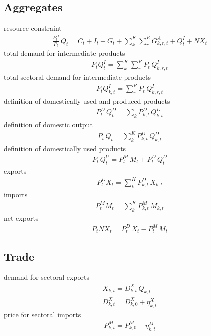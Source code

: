 \subsection{Aggregates}
resource constraint
\begin{align}
\frac{P^{D}_t}{P_t} \, Q_{t} = C_{t} + I_{t} + G_{t} + \sum_{k}^{K} \sum_{r}^{R} {G^{A}_{k,r,t}} + Q^{I}_{t} + {NX_{t}} \label{eq:resourceconstraint}
\end{align}
total demand for intermediate products
\begin{align}
P_{t} Q^{I}_{t} = \sum_{k}^{K} \sum_{r}^{R} P_{t} \, Q^{I}_{k,r,t}
\end{align}
total sectoral demand for intermediate products
\begin{align}
P_{t} Q^{I}_{k,t} = \sum_{r}^{R} P_{t} \, Q^{I}_{k,r,t}
\end{align}
definition of domestically used and produced products
\begin{align}
P^{D}_{t} \, Q^{D}_{t} = \sum_{k} P^{D}_{k,t} \, Q^{D}_{k,t}
\end{align}
definition of domestic output
\begin{align}
P_{t} \, Q_{t} = \sum_{k}^{K} P^{D}_{k,t} \, Q^{D}_{k,t}
\end{align}
definition of domestically used products
\begin{align}
P_{t} \, Q^{U}_{t} = P^{M}_{t} \, M_{t} + P^{D}_{t} \, Q^{D}_{t}
\end{align}
exports
\begin{align}
P^{D}_{t} X_{t} = \sum_{k}^{K} P^{D}_{k,t} \, X_{k,t}
\end{align}
imports
\begin{align}
P^{M}_{t} M_{t} = \sum_{k}^{K} P^{M}_{k,t} \, M_{k,t}
\end{align}
net exports
\begin{align}
P_{t} NX_{t} = P^{D}_{t} \, X_{t} - P^{M}_{t} \, M_{t} \label{eq:netexports}
\end{align}

\subsection{Trade}
demand for sectoral exports
\begin{align}
{X_{k,t}} = D^{X}_{k,t} \, Q_{k,t} \nonumber \\
D^{X}_{k,t} = D^{X}_{k,0} + \eta^{X}_{k,t} \label{eq:exportsdemand}
\end{align}
price for sectoral imports
\begin{align}
P^{M}_{k,t} = P^{M}_{k,0} + \eta^{M}_{k,t} \label{eq:importprices}
\end{align}

